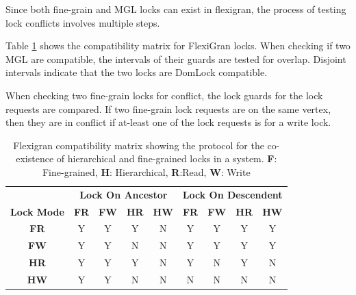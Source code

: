 Since both fine-grain and MGL locks can exist in flexigran, the process of testing lock conflicts involves multiple steps. 

Table \ref{tab:flexigran_locks} shows the compatibility matrix for FlexiGran locks. When checking if two MGL are compatible, the intervals of their guards are tested for overlap. Disjoint intervals indicate that the two locks are DomLock compatible.

When checking two fine-grain locks for conflict, the lock guards for the lock requests are compared. If two fine-grain lock requests are on the same vertex, then they are in conflict if at-least one of the lock requests is for a write lock.


\begin{table}[h]
    \centering
    \captionsetup{justification=centering}
    \begin{tabular}{c|cccc|cccc|}
        \multicolumn{1}{c}{} & \multicolumn{4}{c|}{\textbf{Lock On Ancestor}} & \multicolumn{4}{c}{\textbf{Lock On Descendent}} \\
        \cline{2-9}
        \textbf{Lock Mode} & \textbf{FR} & \textbf{FW} & \textbf{HR} & \textbf{HW} & \textbf{FR} & \textbf{FW} & \textbf{HR} & \textbf{HW} \\
        \hline
        \textbf{FR} & \cellcolor{green!25} Y & \cellcolor{green!25} Y & \cellcolor{green!25} Y & \cellcolor{red!25} N & \cellcolor{green!25} Y & \cellcolor{green!25} Y & \cellcolor{green!25} Y & \cellcolor{green!25} Y \\
        \textbf{FW} & \cellcolor{green!25} Y & \cellcolor{green!25} Y & \cellcolor{red!25} N & \cellcolor{red!25} N & \cellcolor{green!25} Y & \cellcolor{green!25} Y & \cellcolor{green!25} Y & \cellcolor{green!25} Y \\
        \textbf{HR} & \cellcolor{green!25} Y & \cellcolor{green!25} Y & \cellcolor{green!25} Y & \cellcolor{red!25} N & \cellcolor{green!25} Y & \cellcolor{red!25} N & \cellcolor{green!25} Y & \cellcolor{red!25} N \\
        \textbf{HW} & \cellcolor{green!25} Y & \cellcolor{green!25} Y & \cellcolor{red!25} N & \cellcolor{red!25} N & \cellcolor{red!25} N & \cellcolor{red!25} N & \cellcolor{red!25} N & \cellcolor{red!25} N \\
    \end{tabular}
    \caption{Flexigran compatibility matrix showing the protocol for the co-existence of hierarchical and fine-grained locks in a system. \textbf{F}: Fine-grained, \textbf{H}: Hierarchical, \textbf{R}:Read, \textbf{W}: Write}
    \label{tab:flexigran_locks}
\end{table}

